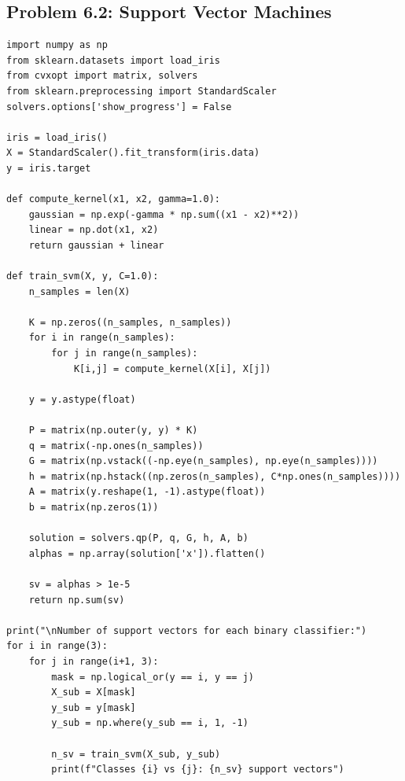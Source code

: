 \documentclass[11pt]{article}
\begin{document}
\subsection{Problem 6.2: Support Vector Machines}


\begin{verbatim}
import numpy as np
from sklearn.datasets import load_iris
from cvxopt import matrix, solvers
from sklearn.preprocessing import StandardScaler
solvers.options['show_progress'] = False

iris = load_iris()
X = StandardScaler().fit_transform(iris.data)
y = iris.target

def compute_kernel(x1, x2, gamma=1.0):
    gaussian = np.exp(-gamma * np.sum((x1 - x2)**2))
    linear = np.dot(x1, x2)
    return gaussian + linear

def train_svm(X, y, C=1.0):
    n_samples = len(X)
    
    K = np.zeros((n_samples, n_samples))
    for i in range(n_samples):
        for j in range(n_samples):
            K[i,j] = compute_kernel(X[i], X[j])
    
    y = y.astype(float)
    
    P = matrix(np.outer(y, y) * K)
    q = matrix(-np.ones(n_samples))
    G = matrix(np.vstack((-np.eye(n_samples), np.eye(n_samples))))
    h = matrix(np.hstack((np.zeros(n_samples), C*np.ones(n_samples))))
    A = matrix(y.reshape(1, -1).astype(float))
    b = matrix(np.zeros(1))
    
    solution = solvers.qp(P, q, G, h, A, b)
    alphas = np.array(solution['x']).flatten()
    
    sv = alphas > 1e-5
    return np.sum(sv)

print("\nNumber of support vectors for each binary classifier:")
for i in range(3):
    for j in range(i+1, 3):
        mask = np.logical_or(y == i, y == j)
        X_sub = X[mask]
        y_sub = y[mask]
        y_sub = np.where(y_sub == i, 1, -1)
        
        n_sv = train_svm(X_sub, y_sub)
        print(f"Classes {i} vs {j}: {n_sv} support vectors")
\end{verbatim}
\end{document}
